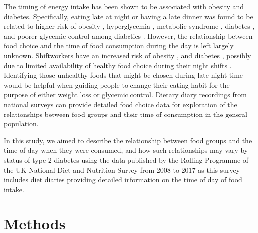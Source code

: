 \documentclass{bmcart}
\begin{document}
The timing of energy intake has been shown to be associated with obesity and diabetes. \cite{almoosawi2016chrono} Specifically, eating late at night or having a late dinner was found to be related to higher risk of obesity \cite{xiao2019meal,yoshida2018association}, hyperglycemia \cite{nakajima2015association}, metabolic syndrome \cite{kutsuma2014potential}, diabetes \cite{mattson2014meal}, and poorer glycemic control among diabetics \cite{sakai2017late}. However, the relationship between food choice and the time of food consumption during the day is left largely unknown. Shiftworkers have an increased risk of obesity \cite{balieiro2014nutritional,barbadoro2013rotating}, and diabetes \cite{pan2011rotating}, possibly due to limited availability of healthy food choice during their night shifts \cite{bonnell2017influences,balieiro2014nutritional}. Identifying those unhealthy foods that might be chosen during late night time would be helpful when guiding people to change their eating habit for the purpose of either weight loss or glycemic control. Dietary diary recordings from national surveys can provide detailed food choice data for exploration of the relationships between food groups and their time of consumption in the general population.

In this study, we aimed to describe the relationship between food groups and the time of day when they were consumed, and how such relationships may vary by status of type 2 diabetes using the data published by the Rolling Programme of the UK National Diet and Nutrition Survey from 2008 to 2017 as this survey includes diet diaries providing detailed information on the time of day of food intake.

\section*{Methods}
\end{document}
